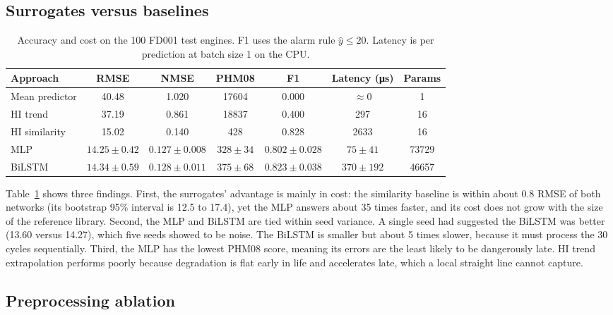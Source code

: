 \documentclass[11pt,a4paper]{article}
\begin{document}
\subsection{Surrogates versus baselines}

\begin{table}[h]
\centering
\small
\begin{tabular}{lcccccc}
\toprule
Approach & RMSE & NMSE & PHM08 & F1 & Latency (\si{\micro\second}) & Params \\
\midrule
Mean predictor & 40.48 & 1.020 & 17604 & 0.000 & $\approx 0$ & 1 \\
HI trend       & 37.19 & 0.861 & 18837 & 0.400 & 297  & 16 \\
HI similarity  & 15.02 & 0.140 & 428   & 0.828 & 2633 & 16 \\
MLP    & $14.25 \pm 0.42$ & $0.127 \pm 0.008$ & $328 \pm 34$ & $0.802 \pm 0.028$ & $75 \pm 41$   & \num{73729} \\
BiLSTM & $14.34 \pm 0.59$ & $0.128 \pm 0.011$ & $375 \pm 68$ & $0.823 \pm 0.038$ & $370 \pm 192$ & \num{46657} \\
\bottomrule
\end{tabular}
\caption{Accuracy and cost on the 100 FD001 test engines. F1 uses the alarm
rule $\hat{y} \le 20$. Latency is per prediction at batch size 1 on the CPU.}
\label{tab:models}
\end{table}

Table~\ref{tab:models} shows three findings. First, the surrogates' advantage
is mainly in cost: the similarity baseline is within about 0.8 RMSE of both
networks (its bootstrap 95\% interval is 12.5 to 17.4), yet the MLP answers
about 35 times faster, and its cost does not grow with the size of the
reference library. Second, the MLP and BiLSTM are tied within seed variance. A
single seed had suggested the BiLSTM was better (13.60 versus 14.27), which
five seeds showed to be noise. The BiLSTM is smaller but about 5 times slower,
because it must process the 30 cycles sequentially. Third, the MLP has the
lowest PHM08 score, meaning its errors are the least likely to be dangerously
late. HI trend extrapolation performs poorly because degradation is flat early
in life and accelerates late, which a local straight line cannot capture.

\subsection{Preprocessing ablation}
\end{document}
